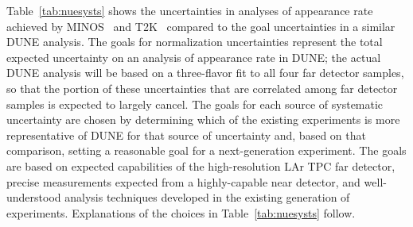 Table~\ref{tab:nuesysts} shows the uncertainties in
analyses of \nue appearance rate achieved by MINOS~\cite{Adamson:2013ue}
and T2K~\cite{Abe:2015awa} compared to the goal uncertainties in a similar DUNE analysis.
The goals for normalization uncertainties represent the total expected uncertainty on
an analysis of \nue appearance rate in DUNE; the actual DUNE analysis will be based on
a three-flavor fit to all four far detector samples, so that the portion of these
uncertainties that are correlated among far detector samples is expected to largely
cancel. The goals for each source of systematic uncertainty are chosen by determining which
of the existing experiments is more representative of DUNE for that source
of uncertainty and, based on that comparison, setting a reasonable goal for a next-generation
experiment. The goals are based on expected capabilities of the high-resolution
LAr TPC far detector, precise measurements expected from a highly-capable near detector,
and well-understood analysis techniques developed in the existing generation of experiments.
Explanations of the choices in Table~\ref{tab:nuesysts} follow.
%
